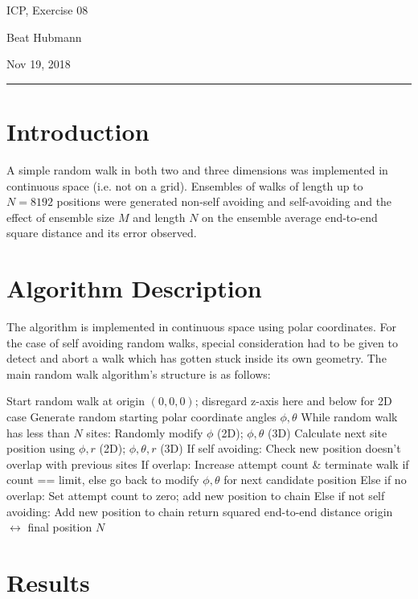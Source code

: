 \documentclass[11pt,a4paper]{article}
\begin{document}
\noindent\parbox{\linewidth}{
 \parbox{.25\linewidth}{ \large ICP, Exercise 08 }\hfill
 \parbox{.5\linewidth}{\begin{center} \large Beat Hubmann \end{center}}\hfill
 \parbox{.2\linewidth}{\begin{flushright} \large Nov 19, 2018 \end{flushright}}
}
\noindent\rule{\linewidth}{2pt}


\section{Introduction}

A simple random walk in both two and three dimensions was implemented in continuous space (i.e. not on a grid).
Ensembles of walks of length up to $N=8192$ positions were generated non-self avoiding and self-avoiding and the 
effect of ensemble size $M$ and length $N$ on the ensemble average end-to-end square distance and its error observed.

\section{Algorithm Description}
The algorithm is implemented in continuous space using polar coordinates. For the case of self avoiding random walks,
special consideration had to be given to detect and abort a walk which has gotten stuck inside its own geometry.
The main random walk algorithm's structure is as follows:
\begin{outline}
	\1 Start random walk at origin $(0,0,0)$; disregard z-axis here and below for 2D case
	\1 Generate random starting polar coordinate angles $\phi, \theta$
	\1 While random walk has less than $N$ sites:
		\2 Randomly modify $\phi$ (2D); $\phi, \theta$ (3D)
		\2 Calculate next site position using $\phi, r$ (2D); $\phi, \theta, r$ (3D)
		\2 If self avoiding:
			\3 Check new position doesn't overlap with previous sites
				\4 If overlap: Increase attempt count \& terminate walk if count == limit, else go back to modify $\phi, \theta$ for next candidate position
				\4 Else if no overlap: Set attempt count to zero; add new position to chain
		\2 Else if not self avoiding:
			\3 Add new position to chain	
	\1 return squared end-to-end distance origin $\leftrightarrow$ final position $N$
\end{outline}


\section{Results}
\end{document}

